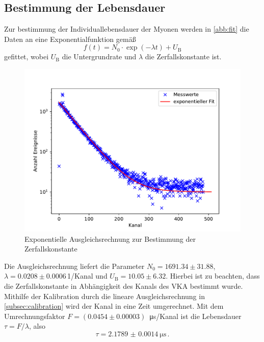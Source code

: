 \subsection{Bestimmung der Lebensdauer}
\label{subsec:lifetime}
Zur bestimmung der Individuallebensdauer der Myonen werden in \autoref{abb:fit} die Daten an eine Exponentialfunktion gemäß
\begin{equation}
f(t) = N_0 \cdot \exp{( -\lambda t)} + U_{\text{B}}
\end{equation}
gefittet, wobei $U_{\text{B}}$ die Untergrundrate und $\lambda$ die Zerfallskonstante ist.
\begin{figure}[h!]
	\centering
	\includegraphics[width=\textwidth]{img/myons.pdf}
	\caption{Exponentielle Ausgleichsrechnung zur Bestimmung der Zerfallskonstante}
	\label{abb:fit}
\end{figure}
Die Ausgleichsrechnung liefert die Parameter $N_0 = 1691.34 \pm 31.88$, $\lambda = 0.0208 \pm 0.0006$\,1/Kanal und $U_\text{B} = 10.05 \pm 6.32$. Hierbei ist zu beachten, dass die Zerfallskonstante in Abhängigkeit des Kanals des VKA bestimmt wurde. Mithilfe der Kalibration durch die lineare Ausgleichsrechnung in \autoref{subsec:calibration} wird der Kanal in eine Zeit umgerechnet. Mit dem Umrechnungsfaktor $F = (0.0454 \pm 0.00003) \,$ \si{\micro\second}/Kanal ist die Lebensdauer $\tau = F / \lambda$, also
\begin{equation}
\tau = \SI[separate-uncertainty=true]{2.1789(14)}{\micro\second} \, .
\end{equation}
